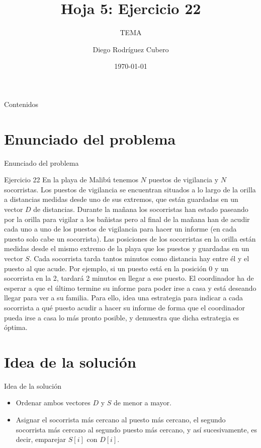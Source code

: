 \documentclass[aspectratio=169]{beamer}
\title{Hoja 5: Ejercicio 22}
\subtitle{TEMA}
\author{Diego Rodríguez Cubero}
\institute{UCM}
\date{\today}
\begin{document}
\begin{frame}
    \titlepage
\end{frame}

\begin{frame}{Contenidos}
    \tableofcontents
\end{frame}

\section{Enunciado del problema}
\begin{frame}{Enunciado del problema}
    \begin{block}{Ejercicio 22}
        En la playa de Malibú tenemos $N$ puestos de vigilancia y $N$ socorristas. Los puestos de vigilancia se encuentran situados a lo largo de la orilla a distancias medidas desde uno de sus extremos, que están guardadas en un vector $D$ de distancias. Durante la mañana los socorristas han estado paseando por la orilla para vigilar a los bañistas pero al final de la mañana han de acudir cada uno a uno de los puestos de vigilancia para hacer un informe (en cada puesto solo cabe un socorrista). Las posiciones de los socorristas en la orilla están medidas desde el mismo extremo de la playa que los puestos y guardadas en un vector $S$. Cada socorrista tarda tantos minutos como distancia hay entre él y el puesto al que acude. Por ejemplo, si un puesto está en la posición 0 y un socorrista en la 2, tardará 2 minutos en llegar a ese puesto. El coordinador ha de esperar a que el último termine su informe para poder irse a casa y está deseando llegar para ver a su familia. Para ello, idea una estrategia para indicar a cada socorrista a qué puesto acudir a hacer su informe de forma que el coordinador pueda irse a casa lo más pronto posible, y demuestra que dicha estrategia es óptima.
    \end{block}
\end{frame}

\section{Idea de la solución}
\begin{frame}{Idea de la solución}
    \begin{itemize}
        \item Ordenar ambos vectores $D$ y $S$ de menor a mayor.
        \item Asignar el socorrista más cercano al puesto más cercano, el segundo socorrista más cercano al segundo puesto más cercano, y así sucesivamente, es decir, emparejar $S[i]$ con $D[i]$.
    \end{itemize}
\end{frame}
\end{document}
